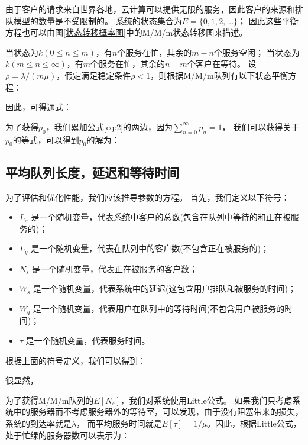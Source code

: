 \documentclass{morningstar}
\begin{document}
由于客户的请求来自世界各地，云计算可以提供无限的服务，因此客户的来源和排队模型的数量是不受限制的。
系统的状态集合为$E=\{0,1,2,...\}$；
因此这些平衡方程也可以由图\ref{状态转移概率图}中的M/M/m状态转移图来描述。
\par

当状态为$k(0 \le n \le m)$，有$n$个服务在忙，其余的$m-n$个服务空闲；
当状态为$k(m \le n \le \infty)$，有$m$个服务在忙，其余的$n-m$个客户在等待。
设 $\rho = \lambda /(m\mu)$，假定满足稳定条件$\rho < 1$，则根据M/M/m队列有以下状态平衡方程：



\noindent 因此，可得通式：


为了获得$p_0$，我们累加公式\ref{eq:2}的两边，因为$\sum_{n=0}^{\infty}p_n = 1$，
我们可以获得关于$p_0$的等式，可以得到$p_0$的解为：



\subsection{平均队列长度，延迟和等待时间}
\label{平均队列长度，延迟和等待时间}

为了评估和优化性能，我们应该推导参数的方程。
首先，我们定义以下符号：

\begin{itemize}[leftmargin=4em]
    \item $L_s$ 是一个随机变量，代表系统中客户的总数(包含在队列中等待的和正在被服务的)；
    \item $L_q$ 是一个随机变量，代表在队列中的客户数(不包含正在被服务的)；
    \item $N_s$ 是一个随机变量，代表正在被服务的客户数；
    \item $W_s$ 是一个随机变量，代表系统中的延迟(这包含用户排队和被服务的时间)；
    \item $W_q$ 是一个随机变量，代表用户在队列中的等待时间(不包含用户被服务的时间)；
    \item $\tau$ 是一个随机变量，代表服务时间。
\end{itemize}

根据上面的符号定义，我们可以得到：

很显然，


为了获得M/M/m队列的$E[N_s]$，我们对系统使用Little公式。
如果我们只考虑系统中的服务器而不考虑服务器外的等待室，可以发现，由于没有阻塞带来的损失，系统的到达率就是$\lambda$，
而平均服务时间就是$E[\tau] = 1 / \mu$。因此，根据Little公式，处于忙绿的服务器数可以表示为：

\end{document}
